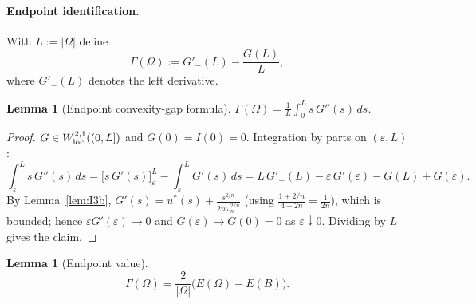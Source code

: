 \documentclass[11pt]{article}
\newtheorem{lemma}[theorem]{Lemma}
\theoremstyle{definition}
\newcommand{\Om}{\Omega}
\newcommand{\eps}{\varepsilon}
\begin{document}
\paragraph{Endpoint identification.} With $L:=|\Om|$ define
\begin{equation}\label{eq:Gammadef}
   \Gamma(\Om):=G'_{-}(L)-\frac{G(L)}{L},
\end{equation}
where $G'_{-}(L)$ denotes the left derivative.

\begin{lemma}[Endpoint convexity-gap formula]\label{lem:gap}
$\Gamma(\Om)=\frac{1}{L}\int_{0}^{L}s\,G''(s)\,ds$.
\end{lemma}

\begin{proof}
$G\in W^{2,1}_{\rm loc}((0,L])$ and $G(0)=I(0)=0$. Integration by parts
on $(\eps,L)$:
\[
   \int_{\eps}^{L}s\,G''(s)\,ds
   =\bigl[s\,G'(s)\bigr]_{\eps}^{L}-\int_{\eps}^{L}G'(s)\,ds
   =L\,G'_{-}(L)-\eps\,G'(\eps)-G(L)+G(\eps).
\]
By Lemma~\ref{lem:I3b}, $G'(s)=u^{*}(s)+\frac{s^{2/n}}{2n\omega_{n}^{2/n}}$
(using $\frac{1+2/n}{4+2n}=\frac{1}{2n}$),
which is bounded; hence $\eps G'(\eps)\to 0$ and $G(\eps)\to G(0)=0$ as
$\eps\downarrow 0$. Dividing by $L$ gives the claim.
\end{proof}

\begin{lemma}[Endpoint value]\label{lem:endpoint}
\begin{equation}\label{eq:endpoint}
   \Gamma(\Om)=\frac{2}{|\Om|}\bigl(E(\Om)-E(B)\bigr).
\end{equation}
\end{lemma}
\end{document}
